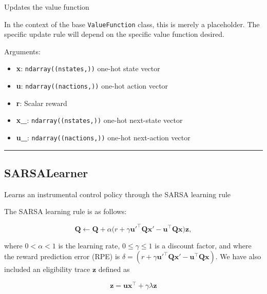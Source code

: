 Updates the value function

In the context of the base \texttt{ValueFunction} class, this is merely
a placeholder. The specific update rule will depend on the specific
value function desired.

Arguments:

\begin{itemize}
\tightlist
\item
  \textbf{x}: \texttt{ndarray((nstates,))} one-hot state vector
\item
  \textbf{u}: \texttt{ndarray((nactions,))} one-hot action vector
\item
  \textbf{r}: Scalar reward
\item
  \textbf{x\_}: \texttt{ndarray((nstates,))} one-hot next-state vector
\item
  \textbf{u\_}: \texttt{ndarray((nactions,))} one-hot next-action vector
\end{itemize}

\begin{center}\rule{0.5\linewidth}{\linethickness}\end{center}

\subsection{SARSALearner}\label{sarsalearner}

\begin{Shaded}
\begin{Highlighting}[]
\end{Highlighting}
\end{Shaded}

Learns an instrumental control policy through the SARSA learning rule

The SARSA learning rule is as follows:

\[
\mathbf Q \gets \mathbf Q + \alpha \big(r + \gamma \mathbf u'^\top \mathbf Q \mathbf x' - \mathbf u^\top \mathbf Q \mathbf x \big) \mathbf z,
\]

where \(0 < \alpha < 1\) is the learning rate, \(0 \leq \gamma \leq 1\)
is a discount factor, and where the reward prediction error (RPE) is
\(\delta = (r + \gamma \mathbf u'^\top \mathbf Q \mathbf x' - \mathbf u^\top \mathbf Q \mathbf x)\).
We have also included an eligibility trace \(\mathbf z\) defined as

\[
\mathbf z = \mathbf u \mathbf x^\top +  \gamma \lambda \mathbf z
\]

